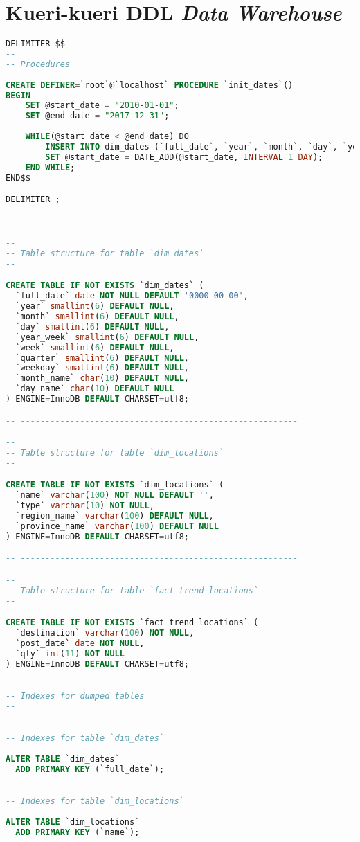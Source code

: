 \chapter{Kueri-kueri DDL \textit{Data Warehouse}}
\label{app:G}

\singlespacing 
\begin{lstlisting}[language=SQL,basicstyle=\tiny,caption=Kueri MySQL]
DELIMITER $$
--
-- Procedures
--
CREATE DEFINER=`root`@`localhost` PROCEDURE `init_dates`()
BEGIN
  	SET @start_date = "2010-01-01";
	SET @end_date = "2017-12-31";
    
    WHILE(@start_date < @end_date) DO 
    	INSERT INTO dim_dates (`full_date`, `year`, `month`, `day`, `year_week`, `week`, `quarter`, `weekday`, `month_name`, `day_name`) VALUES (DATE_FORMAT(@start_date, "%Y%m%d"), YEAR(@start_date), MONTH(@start_date), DAY(@start_date), DATE_FORMAT(@start_date, "%x"), WEEK(@start_date, 3), QUARTER(@start_date), WEEKDAY(@start_date)+1, MONTHNAME(@start_date), DAYNAME(@start_date));
        SET @start_date = DATE_ADD(@start_date, INTERVAL 1 DAY);
    END WHILE;
END$$

DELIMITER ;

-- --------------------------------------------------------

--
-- Table structure for table `dim_dates`
--

CREATE TABLE IF NOT EXISTS `dim_dates` (
  `full_date` date NOT NULL DEFAULT '0000-00-00',
  `year` smallint(6) DEFAULT NULL,
  `month` smallint(6) DEFAULT NULL,
  `day` smallint(6) DEFAULT NULL,
  `year_week` smallint(6) DEFAULT NULL,
  `week` smallint(6) DEFAULT NULL,
  `quarter` smallint(6) DEFAULT NULL,
  `weekday` smallint(6) DEFAULT NULL,
  `month_name` char(10) DEFAULT NULL,
  `day_name` char(10) DEFAULT NULL
) ENGINE=InnoDB DEFAULT CHARSET=utf8;

-- --------------------------------------------------------

--
-- Table structure for table `dim_locations`
--

CREATE TABLE IF NOT EXISTS `dim_locations` (
  `name` varchar(100) NOT NULL DEFAULT '',
  `type` varchar(10) NOT NULL,
  `region_name` varchar(100) DEFAULT NULL,
  `province_name` varchar(100) DEFAULT NULL
) ENGINE=InnoDB DEFAULT CHARSET=utf8;

-- --------------------------------------------------------

--
-- Table structure for table `fact_trend_locations`
--

CREATE TABLE IF NOT EXISTS `fact_trend_locations` (
  `destination` varchar(100) NOT NULL,
  `post_date` date NOT NULL,
  `qty` int(11) NOT NULL
) ENGINE=InnoDB DEFAULT CHARSET=utf8;

--
-- Indexes for dumped tables
--

--
-- Indexes for table `dim_dates`
--
ALTER TABLE `dim_dates`
  ADD PRIMARY KEY (`full_date`);

--
-- Indexes for table `dim_locations`
--
ALTER TABLE `dim_locations`
  ADD PRIMARY KEY (`name`);
\end{lstlisting}

